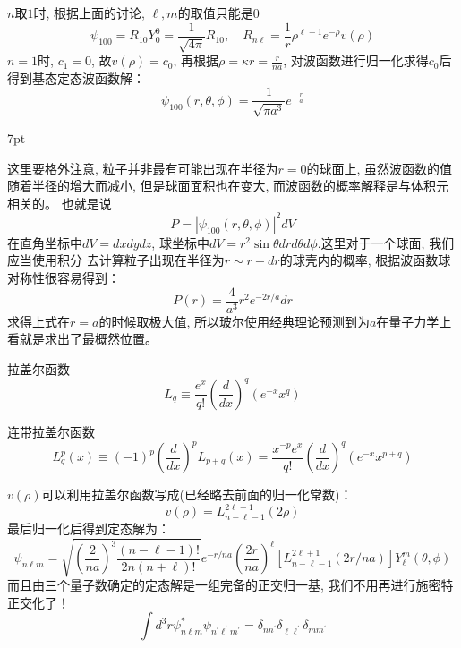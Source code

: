 \documentclass[a4paper,zihao=-4,linespread=1]{ctexrep}
\newenvironment{lequation}{\large\begin{equation}}{\end{equation}}
\newenvironment{thinknote}{%
\def\FrameCommand{%
\hspace{1pt}%
{\color{BurlyWood}\vrule width 2pt}%
{\color{formalshade}\vrule width 4pt}%
\colorbox{formalshade}%
}%
\MakeFramed{\advance\hsize-\width\FrameRestore}%
\noindent\hspace{-4.55pt}%
\begin{adjustwidth}{}{7pt}%
\vspace{2pt}\vspace{2pt}%
}
{%
\vspace{2pt}\end{adjustwidth}\endMakeFramed%
}
\begin{document}
    $n$取$1$时, 根据上面的讨论, $\ell,m$的取值只能是$0$
    \[\psi_{100}=R_{10}Y_0^0=\frac{1}{\sqrt{4\pi}}R_{10},\quad R_{n\ell}=\frac{1}{r}\rho^{\ell+1}e^{-\rho}v(\rho)\]
    $n=1$时, $c_1=0$, 故$v(\rho)=c_0$, 再根据$\rho=\kappa r=\frac{r}{n a}$, 对波函数进行归一化求得$c_0$后得到基态定态波函数解：
    \begin{lequation}
        \label{eq:4.41}
        \boxed{\psi_{100}(r,\theta,\phi)=\frac{1}{\sqrt{\pi a^3}}e^{-\frac{r}{a}}}
    \end{lequation}
    \begin{thinknote}
        这里要格外注意, 粒子并非最有可能出现在半径为$r=0$的球面上, 虽然波函数的值随着半径的增大而减小, 但是球面面积也在变大, 而波函数的概率解释是与体积元相关的。
        也就是说\[P=\left|\psi_{100}(r,\theta,\phi)\right|^2dV\]在直角坐标中$dV=dxdydz$, 球坐标中$dV=r^2\sin\theta drd\theta d\phi$.这里对于一个球面, 我们应当使用积分
        去计算粒子出现在半径为$r\sim r+dr$的球壳内的概率, 根据波函数球对称性很容易得到：\[P(r)=\frac{4}{a^3}r^2e^{-2r/a}dr\]
        求得上式在$r=a$的时候取极大值, 所以玻尔使用经典理论预测到为$a$在量子力学上看就是求出了最概然位置。
    \end{thinknote}
    \begin{define}{拉盖尔函数}
        \begin{equation}
            L_q\equiv\frac{e^x}{q!}\left(\frac{d}{dx}\right)^q\left(e^{-x}x^q\right)    
        \end{equation}
    \end{define}
    \begin{define}{连带拉盖尔函数}
        \begin{equation}
            L_q^p(x)\equiv(-1)^p\left(\frac{d}{dx}\right)^pL_{p+q}(x)=\frac{x^{-p}e^x}{q!}\left(\frac{d}{dx}\right)^q\left(e^{-x}x^{p+q}\right)
        \end{equation}
    \end{define}
    $v(\rho)$可以利用拉盖尔函数写成(已经略去前面的归一化常数)：
    \begin{equation}
        v(\rho)=L_{n-\ell-1}^{2\ell+1}(2\rho)
    \end{equation}
    最后归一化后得到定态解为：
    \begin{equation}
        \boxed{
            \psi_{n \ell m}=\sqrt{\left(\frac{2}{n a}\right)^{3} \frac{(n-\ell-1) !}{2 n(n+\ell) !}} e^{-r / n a}\left(\frac{2 r}{n a}\right)^{\ell}\left[L_{n-\ell-1}^{2 \ell+1}(2 r / n a)\right] Y_{\ell}^{m}(\theta, \phi)
        }
    \end{equation}
    而且由三个量子数确定的定态解是一组完备的正交归一基, 我们不用再进行施密特正交化了！
    \begin{equation}
        \int d^3r \psi_{n\ell m}^*\psi_{n^\prime\ell^\prime m^\prime}=\delta_{nn^\prime}\delta_{\ell \ell^\prime}\delta_{mm^\prime}
    \end{equation}
    
\end{document}
